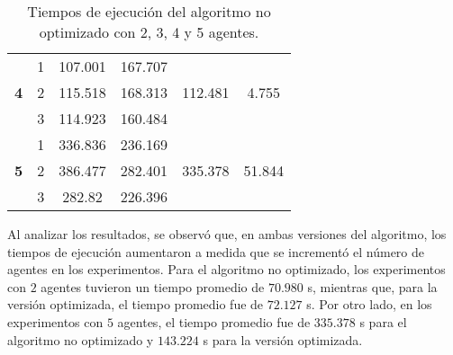 \begin{table}[H]
{\begin{tabular}{|c|c|llcc|}
		\multirow{3}{*}{\textbf{4}}       & 1                                 & \multicolumn{1}{c|}{107.001}                   & \multicolumn{1}{c|}{167.707}                                & \multicolumn{1}{c|}{\multirow{3}{*}{112.481}}           & \multirow{3}{*}{4.755}           \\ \cline{2-4}
		& 2                                 & \multicolumn{1}{c|}{115.518}                   & \multicolumn{1}{c|}{168.313}                                & \multicolumn{1}{c|}{}                                   &                                  \\ \cline{2-4}
		& 3                                 & \multicolumn{1}{c|}{114.923}                   & \multicolumn{1}{c|}{160.484}                                & \multicolumn{1}{c|}{}                                   &                                  \\ \hline
		\multirow{3}{*}{\textbf{5}}       & 1                                 & \multicolumn{1}{c|}{336.836}                   & \multicolumn{1}{c|}{236.169}                                & \multicolumn{1}{c|}{\multirow{3}{*}{335.378}}           & \multirow{3}{*}{51.844}          \\ \cline{2-4}
		& 2                                 & \multicolumn{1}{c|}{386.477}                   & \multicolumn{1}{c|}{282.401}                                & \multicolumn{1}{c|}{}                                   &                                  \\ \cline{2-4}
		& 3                                 & \multicolumn{1}{c|}{282.82}                    & \multicolumn{1}{c|}{226.396}                                & \multicolumn{1}{c|}{}                                   &                                  \\ \hline
	\end{tabular}}
	\caption{Tiempos de ejecución del algoritmo no optimizado con 2, 3, 4 y 5 agentes.}
	\label{cuadro:tiempos_nooptim}
\end{table}

Al analizar los resultados, se observó que, en ambas versiones del algoritmo, los tiempos de ejecución aumentaron a medida que se incrementó el número de agentes en los experimentos. Para el algoritmo no optimizado, los experimentos con $2$ agentes tuvieron un tiempo promedio de $70.980$ s, mientras que, para la versión optimizada, el tiempo promedio fue de $72.127$ s. Por otro lado, en los experimentos con $5$ agentes, el tiempo promedio fue de $335.378$ s para el algoritmo no optimizado y $143.224$ s para la versión optimizada.

